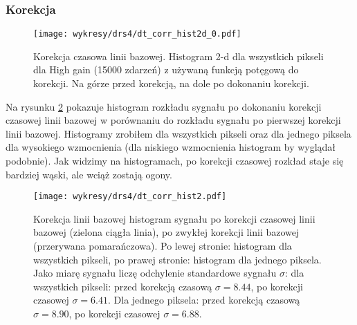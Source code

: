 \documentclass[a4paper,11pt,twoside]{article}
\begin{document}
\subsubsection{Korekcja}

\begin{figure}[H] 
\centering
\texttt{[image: wykresy/drs4/dt\_corr\_hist2d\_0.pdf]}
\caption{Korekcja czasowa linii bazowej. Histogram 2-d dla wszystkich pikseli dla High gain (15000 zdarzeń) z używaną funkcją potęgową do korekcji. Na górze przed korekcją, na dole po dokonaniu korekcji.}
\label{fig:dt_corr_hist2d_all}
\end{figure}


Na rysunku \ref{fig:dt_corr_hist} pokazuje histogram rozkładu sygnału po dokonaniu korekcji czasowej linii bazowej w porównaniu do rozkładu sygnału po pierwszej korekcji linii bazowej. Histogramy zrobiłem dla wszystkich pikseli oraz dla jednego piksela dla wysokiego wzmocnienia (dla niskiego wzmocnienia histogram by wyglądał podobnie). Jak widzimy na histogramach, po korekcji czasowej rozkład staje się bardziej wąski, ale wciąż zostają ogony.  
\begin{figure}[H] 
\centering
\texttt{[image: wykresy/drs4/dt\_corr\_hist2.pdf]}
\caption{Korekcja linii bazowej histogram sygnału po korekcji czasowej linii bazowej (zielona ciągła linia), po zwykłej korekcji linii bazowej (przerywana pomarańczowa). Po lewej stronie: histogram dla wszystkich pikseli, po prawej stronie: histogram dla jednego piksela. Jako miarę sygnału liczę odchylenie standardowe sygnału $\sigma$: dla wszystkich pikseli: przed korekcją czasową $\sigma = 8.44$, po korekcji czasowej $\sigma = 6.41$. Dla jednego piksela: przed korekcją czasową $\sigma = 8.90$, po korekcji czasowej $\sigma = 6.88$. }
\label{fig:dt_corr_hist}
\end{figure}
\newpage
\end{document}
